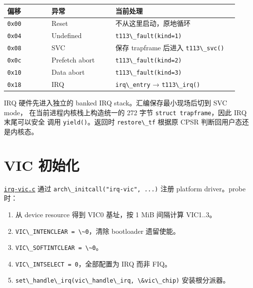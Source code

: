 {\def\LTcaptype{none} %
\begin{longtable}[]{@{}p{0.18\linewidth}p{0.26\linewidth}p{0.50\linewidth}@{}}
\toprule\noalign{}
偏移 & 异常 & 当前处理 \\
\midrule\noalign{}
\endhead
\bottomrule\noalign{}
\endlastfoot
\passthrough{\lstinline!0x00!} & Reset & 不从这里启动，原地循环 \\
\passthrough{\lstinline!0x04!} & Undefined &
\passthrough{\lstinline!t113\_fault(kind=1)!} \\
\passthrough{\lstinline!0x08!} & SVC & 保存 trapframe 后进入
\passthrough{\lstinline!t113\_svc()!} \\
\passthrough{\lstinline!0x0c!} & Prefetch abort &
\passthrough{\lstinline!t113\_fault(kind=2)!} \\
\passthrough{\lstinline!0x10!} & Data abort &
\passthrough{\lstinline!t113\_fault(kind=3)!} \\
\passthrough{\lstinline!0x18!} & IRQ &
\passthrough{\lstinline!irq\_entry!} →
\passthrough{\lstinline!t113\_irq()!} \\
\end{longtable}
}

IRQ 硬件先进入独立的 banked IRQ stack。汇编保存最小现场后切到 SVC mode，
在当前进程内核栈上构造统一的 272 字节
\passthrough{\lstinline!struct trapframe!}，因此 IRQ 末尾可以安全 调用
\passthrough{\lstinline!yield()!}。返回时
\passthrough{\lstinline!restore\_tf!} 根据原 CPSR
判断回用户态还是内核态。

\section{VIC 初始化}\label{vic-ux521dux59cbux5316}

\href{../../../kernel/drivers/irqchip/irq-vic.c}{\passthrough{\lstinline!irq-vic.c!}}
通过 \passthrough{\lstinline!arch\_initcall("irq-vic", ...)!} 注册
platform driver。probe 时：

\begin{enumerate}
\def\labelenumi{\arabic{enumi}.}
\tightlist
\item
  从 device resource 得到 VIC0 基址，按 1 MiB 间隔计算 VIC1..3。
\item
  \passthrough{\lstinline!VIC\_INTENCLEAR = \~0!}，清除 bootloader
  遗留使能。
\item
  \passthrough{\lstinline!VIC\_SOFTINTCLEAR = \~0!}。
\item
  \passthrough{\lstinline!VIC\_INTSELECT = 0!}，全部配置为 IRQ 而非
  FIQ。
\item
  \passthrough{\lstinline!set\_handle\_irq(vic\_handle\_irq, \&vic\_chip)!}
  安装根分派器。
\end{enumerate}

